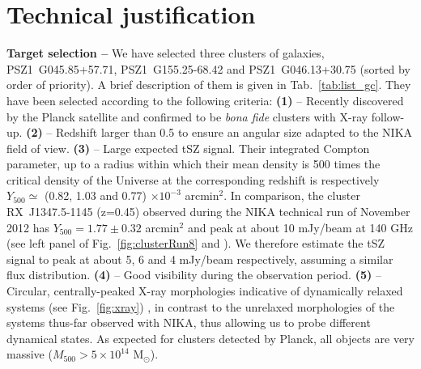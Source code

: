 \documentclass[11pt,a4paper,twoside,graphicx,color]{article}
\begin{document}
\section{Technical justification}
\vspace{-0.3cm}
{\bf \large Target selection -- }
We have selected three clusters of galaxies, PSZ1~G045.85+57.71, PSZ1~G155.25-68.42 and PSZ1~G046.13+30.75 (sorted by order of priority). A brief description of them is given in Tab.~\ref{tab:list_gc}. They have been selected according to the following criteria:
{\bf (1)} -- Recently discovered by the Planck satellite and confirmed to be {\it bona fide} clusters with \mbox{X-ray} follow-up. 
{\bf (2)} -- Redshift larger than 0.5 to ensure an angular size adapted to the NIKA field of view. 
{\bf (3)} -- Large expected tSZ signal. Their integrated Compton parameter, up to a radius within which their mean density is 500 times the critical density of the Universe at the corresponding redshift is respectively $Y_{500} \simeq$ (0.82, 1.03 and 0.77) $\times 10^{-3}$ arcmin$^2$. In comparison, the cluster \mbox{RX~J1347.5-1145} (z=0.45) observed during the NIKA technical run of November 2012 has $Y_{500} = 1.77 \pm 0.32$ arcmin$^2$ and peak at about 10 mJy/beam at 140 GHz (see left panel of Fig.~\ref{fig:clusterRun8} and \cite{adam2013}). We therefore estimate the tSZ signal to peak at about 5, 6 and 4 mJy/beam respectively, assuming a similar flux distribution. 
{\bf (4)} -- Good visibility during the observation period. 
{\bf (5)} -- Circular, centrally-peaked X-ray morphologies indicative of dynamically relaxed systems (see Fig.~\ref{fig:xray}) , in contrast to the unrelaxed morphologies of the systems thus-far observed with NIKA, thus allowing us to probe different dynamical states.
As expected for clusters detected by Planck, all objects are very massive ($M_{500} > 5 \times 10^{14}$ M$_{\odot}$).\\
\end{document}
